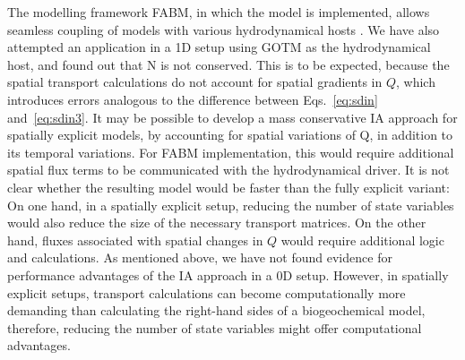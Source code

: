 \documentclass[gmd, manuscript]{copernicus}
\begin{document}

The modelling framework FABM, in which the model is implemented, allows seamless coupling of models with various hydrodynamical hosts \citep{Bruggeman2014}. We have also attempted an application in a 1D setup using GOTM \citep{Burchard2006} as the hydrodynamical host, and found out that N is not conserved. This is to be expected, because the spatial transport calculations do not account for spatial gradients in $Q$, which introduces errors analogous to the difference between Eqs.~\eqref{eq:sdin} and~\eqref{eq:sdin3}.  It may be possible to develop a mass conservative IA approach for spatially explicit models, by accounting for spatial variations of Q, in addition to its temporal variations. For FABM implementation, this would require additional spatial flux terms to be communicated with the hydrodynamical driver. It is not clear whether the resulting model would be faster than the fully explicit variant: On one hand, in a spatially explicit setup, reducing the number of state variables would also reduce the size of the necessary transport matrices.  On the other hand, fluxes associated with spatial changes in $Q$ would require additional logic and calculations. As mentioned above, 
we have not found evidence for performance advantages of the IA approach in a 0D setup. However, in spatially explicit setups, transport calculations can become computationally more demanding than calculating the right-hand sides of a biogeochemical model, therefore, reducing the number of state variables might offer computational advantages.

\end{document}
